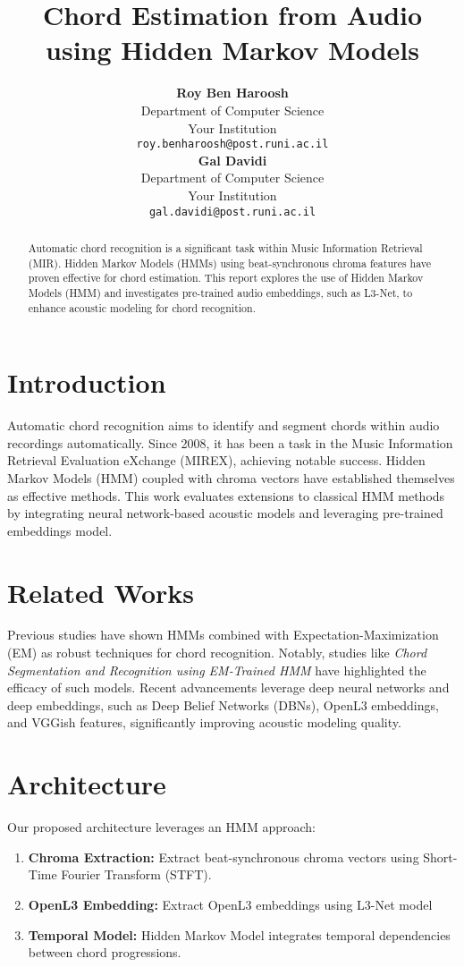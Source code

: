 \documentclass{article}
\title{Chord Estimation from Audio using Hidden Markov Models}
\author{
\textbf{Roy Ben Haroosh}\\
Department of Computer Science\\
Your Institution\\
\texttt{roy.benharoosh@post.runi.ac.il}\\
\textbf{Gal Davidi}\\
Department of Computer Science\\
Your Institution\\
\texttt{gal.davidi@post.runi.ac.il}}
\begin{document}
\maketitle

\begin{abstract}
Automatic chord recognition is a significant task within Music Information Retrieval (MIR).
Hidden Markov Models (HMMs) using beat-synchronous chroma features have proven effective for chord estimation.
This report explores the use of Hidden Markov Models (HMM) and investigates pre-trained audio embeddings,
such as L3-Net, to enhance acoustic modeling for chord recognition.
\end{abstract}

\section{Introduction}
Automatic chord recognition aims to identify and segment chords within audio recordings automatically.
Since 2008, it has been a task in the Music Information Retrieval Evaluation eXchange (MIREX), achieving notable success.
Hidden Markov Models (HMM) coupled with chroma vectors have established themselves as effective methods.
This work evaluates extensions to classical HMM methods by integrating neural network-based acoustic models and leveraging
pre-trained embeddings model.

\section{Related Works}
Previous studies have shown HMMs combined with Expectation-Maximization (EM) as robust techniques for chord recognition.
Notably, studies like \textit{Chord Segmentation and Recognition using EM-Trained HMM} have highlighted the efficacy of such models. Recent advancements leverage deep neural networks and deep embeddings, such as Deep Belief Networks (DBNs), OpenL3 embeddings, and VGGish features, significantly improving acoustic modeling quality.

\section{Architecture}
Our proposed architecture leverages an HMM approach:
\begin{enumerate}
    \item \textbf{Chroma Extraction:} Extract beat-synchronous chroma vectors using Short-Time Fourier Transform (STFT).
    \item \textbf{OpenL3 Embedding:} Extract OpenL3 embeddings using L3-Net model
    \item \textbf{Temporal Model:} Hidden Markov Model integrates temporal dependencies between chord progressions.
\end{enumerate}
\end{document}
